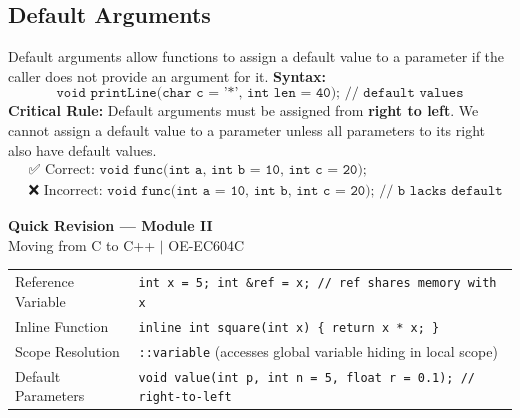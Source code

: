 \documentclass[12pt,a4paper]{article}
\renewcommand{\arraystretch}{1.45}
\begin{document}
\subsection{Default Arguments}
Default arguments allow functions to assign a default value to a parameter if the caller does not provide an argument for it.
\textbf{Syntax:}
\begin{equation}
  \texttt{void printLine(char c = '*', int len = 40); // default values}
\end{equation}
\textbf{Critical Rule:}
Default arguments must be assigned from \textbf{right to left}. We cannot assign a default value to a parameter unless all parameters to its right also have default values.
\begin{align*}
  &\text{✅ Correct: } \texttt{void func(int a, int b = 10, int c = 20);}\\
  &\text{❌ Incorrect: } \texttt{void func(int a = 10, int b, int c = 20); // b lacks default}
\end{align*}

\newpage
\begin{center}
  {\large\bfseries\color{myred} Quick Revision --- Module II}\\[3pt]
  {\small\color{mydark} Moving from C to C++ $|$ OE-EC604C}
\end{center}
\noindent{\color{myred}\rule{\linewidth}{1.2pt}}
\vspace{4pt}

\begin{tcolorbox}[formulabox, title={\textbf{Key Formulas and Syntax}}]
\renewcommand{\arraystretch}{1.3}
\begin{tabularx}{\linewidth}{B{3.6cm} X}
Reference Variable      & \texttt{int x = 5; int \&ref = x; // ref shares memory with x} \\[4pt]
Inline Function         & \texttt{inline int square(int x) \{ return x * x; \}} \\[4pt]
Scope Resolution        & \texttt{::variable} \quad (accesses global variable hiding in local scope) \\[4pt]
Default Parameters      & \texttt{void value(int p, int n = 5, float r = 0.1); // right-to-left}
\end{tabularx}
\end{tcolorbox}
\end{document}
